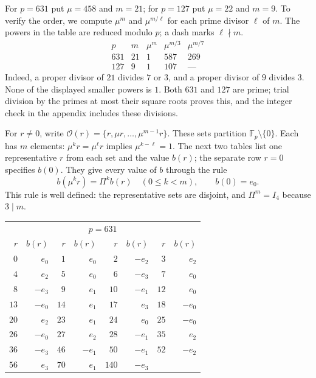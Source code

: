 \documentclass[10pt]{article}
\newcommand{\F}{\mathbb F}
\begin{document}
For $p=631$ put $\mu=458$ and $m=21$; for $p=127$ put $\mu=22$ and
$m=9$. To verify the order, we compute $\mu^m$ and $\mu^{m/\ell}$
for each prime divisor $\ell$ of $m$. The powers in the table are reduced
modulo $p$; a dash marks $\ell\nmid m$.
\[
\begin{array}{c|c|ccc}
p&m&\mu^m&\mu^{m/3}&\mu^{m/7}\\\hline
631&21&1&587&269\\
127&9&1&107&\text{---}
\end{array}
\]
Indeed, a proper divisor of $21$ divides $7$ or $3$, and a proper divisor
of $9$ divides $3$. None of the displayed smaller powers is $1$.
Both $631$ and $127$ are prime; trial division by the primes at most their
square roots proves this, and the integer check in the appendix includes
these divisions.

For $r\ne0$, write
$\mathcal O(r)=\{r,\mu r,\ldots,\mu^{m-1}r\}$.
These sets partition $\F_p\setminus\{0\}$. Each has $m$ elements:
$\mu^kr=\mu^\ell r$ implies $\mu^{k-\ell}=1$.
The next two tables list one representative $r$ from each set and the
value $b(r)$; the separate row $r=0$ specifies $b(0)$.
They give every value of $b$ through the rule
\begin{equation}\label{eq:b-extension}
 b(\mu^k r)=\Pi^k b(r)\quad(0\leq k<m),\qquad b(0)=e_0.
\end{equation}
This rule is well defined: the representative sets are disjoint, and
$\Pi^m=I_4$ because $3\mid m$.

\begin{center}\small
\begin{tabular}{rr@{\quad}rr@{\quad}rr@{\quad}rr}
\multicolumn{8}{c}{$p=631$}\\
$r$&$b(r)$&$r$&$b(r)$&$r$&$b(r)$&$r$&$b(r)$\\\hline
$0$&$e_{0}$&$1$&$e_{0}$&$2$&$-e_{2}$&$3$&$e_{2}$\\
$4$&$e_{2}$&$5$&$e_{0}$&$6$&$-e_{3}$&$7$&$e_{0}$\\
$8$&$-e_{3}$&$9$&$e_{1}$&$10$&$-e_{1}$&$12$&$e_{0}$\\
$13$&$-e_{0}$&$14$&$e_{1}$&$17$&$e_{3}$&$18$&$-e_{0}$\\
$20$&$e_{2}$&$23$&$e_{1}$&$24$&$e_{0}$&$25$&$-e_{0}$\\
$26$&$-e_{0}$&$27$&$e_{2}$&$28$&$-e_{1}$&$35$&$e_{2}$\\
$36$&$-e_{3}$&$46$&$-e_{1}$&$50$&$-e_{1}$&$52$&$-e_{2}$\\
$56$&$e_{3}$&$70$&$e_{1}$&$140$&$-e_{3}$&&\\
\end{tabular}\end{center}
\end{document}
